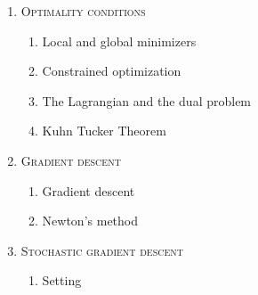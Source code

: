 \begin{enumerate}[label=\textbf{\arabic*.}]
\item \textsc{Optimality conditions}
\vspace{-0.2cm}
\begin{enumerate}[label=\arabic*.,noitemsep]
\item Local and global minimizers
\item Constrained optimization
\item The Lagrangian and the dual problem
\item Kuhn Tucker Theorem
\end{enumerate}
\item \textsc{Gradient descent}
\vspace{-0.2cm}
\begin{enumerate}[label=\arabic*.,noitemsep]
\item Gradient descent
\item Newton's method
\end{enumerate}
\item \textsc{Stochastic gradient descent}
\vspace{-0.2cm}
\begin{enumerate}[label=\arabic*.,noitemsep]
\item Setting
\end{enumerate}
\end{enumerate}
